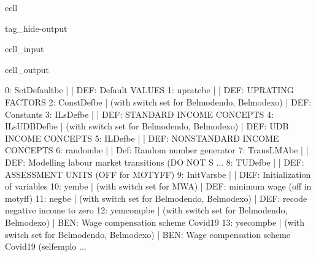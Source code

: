 \documentclass[letterpaper,10pt,english]{sphinxmanual}
\begin{document}
\begin{sphinxuseclass}{cell}
\begin{sphinxuseclass}{tag_hide-output}
\begin{sphinxuseclass}{cell_input}
\begin{sphinxVerbatim}[commandchars=\\\{\}]
\PYG{p}{[}\PYG{p}{]}
\end{sphinxVerbatim}

\end{sphinxuseclass}
\begin{sphinxuseclass}{cell_output}
\begin{sphinxVerbatim}[commandchars=\\\{\}]
0: SetDefault\PYGZus{}be         |                                                       |    DEF: Default VALUES 
1: uprate\PYGZus{}be             |                                                       |    DEF: UPRATING FACTORS 
2: ConstDef\PYGZus{}be           |  (with switch set for Belmod\PYGZus{}endo, Belmod\PYGZus{}exo)        |    DEF: Constants 
3: ILsDef\PYGZus{}be             |                                                       |    DEF: STANDARD INCOME CONCEPTS 
4: ILsUDBDef\PYGZus{}be          |  (with switch set for Belmod\PYGZus{}endo, Belmod\PYGZus{}exo)        |    DEF: UDB INCOME CONCEPTS 
5: ILDef\PYGZus{}be              |                                                       |    DEF: NON\PYGZhy{}STANDARD INCOME CONCEPTS 
6: random\PYGZus{}be             |                                                       |    Def: Random number generator 
7: TransLMA\PYGZus{}be           |                                                       |    DEF: Modelling labour market transitions (DO NOT S ... 
8: TUDef\PYGZus{}be              |                                                       |    DEF: ASSESSMENT UNITS (OFF for MOTYFF) 
9: InitVars\PYGZus{}be           |                                                       |    DEF: Initialization of variables 
10: yem\PYGZus{}be               |  (with switch set for MWA)                            |    DEF: minimum wage  (off in motyff) 
11: neg\PYGZus{}be               |  (with switch set for Belmod\PYGZus{}endo, Belmod\PYGZus{}exo)        |    DEF: recode negative income to zero 
12: yemcomp\PYGZus{}be           |  (with switch set for Belmod\PYGZus{}endo, Belmod\PYGZus{}exo)        |    BEN: Wage compensation scheme Covid\PYGZhy{}19 
13: ysecomp\PYGZus{}be           |  (with switch set for Belmod\PYGZus{}endo, Belmod\PYGZus{}exo)        |    BEN: Wage compensation scheme Covid\PYGZhy{}19 (self\PYGZhy{}emplo ... 

\end{sphinxVerbatim}
\end{sphinxuseclass}
\end{sphinxuseclass}
\end{sphinxuseclass}
\end{document}
